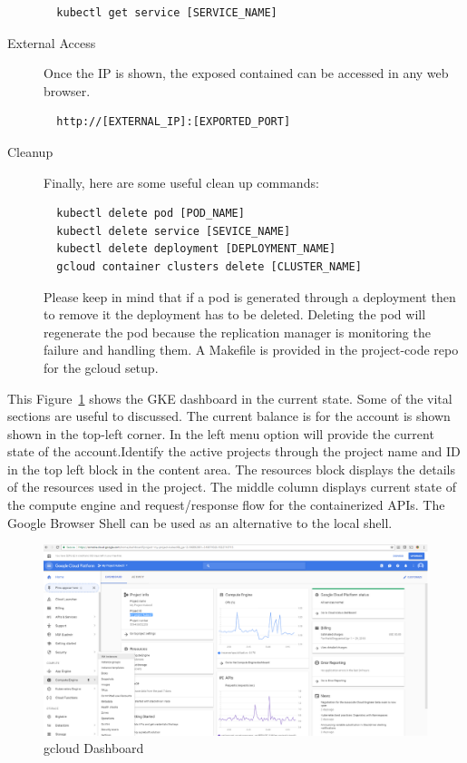 \begin{description}
\begin{verbatim}
  kubectl get service [SERVICE_NAME]
\end{verbatim}

\item [External Access] Once the IP is shown, the exposed contained can be
accessed in any web browser.
\begin{verbatim}
  http://[EXTERNAL_IP]:[EXPORTED_PORT]
\end{verbatim}

\item [Cleanup] Finally, here are some useful clean up commands:
\begin{verbatim}
  kubectl delete pod [POD_NAME]
  kubectl delete service [SEVICE_NAME]
  kubectl delete deployment [DEPLOYMENT_NAME]
  gcloud container clusters delete [CLUSTER_NAME]
\end{verbatim}

  Please keep in mind that if a pod is generated through a deployment then to
  remove it the deployment has to be deleted. Deleting the pod will regenerate
  the pod because the replication manager is monitoring the failure and
  handling them. A Makefile is provided in the project-code repo for the
  gcloud setup.

\end{description}


This Figure~\ref{fig:gcloud-dashboard} shows the GKE dashboard in the current
state. Some of the vital sections are useful to discussed. The current balance
is for the account is shown shown in the top-left corner. In the left menu
option will provide the current state of the account.Identify the active
projects through the project name and ID in the top left block in the content
area. The resources block displays the details of the resources used in the
project. The middle column displays current state of the compute engine and
request/response flow for the containerized APIs. The Google Browser Shell can
be used as an alternative to the local shell.



\begin{figure}[htb]
 \centering\includegraphics[width=\columnwidth]{images/hid_417_gcloud_browser.png}
 \caption{gcloud Dashboard}\label{fig:gcloud-dashboard}
\end{figure}


